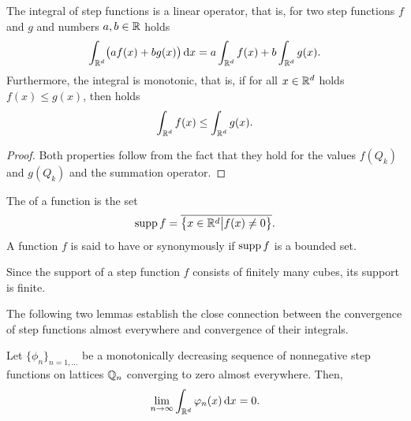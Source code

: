 \begin{lemma}
  The integral of step functions is a linear operator,
  that is, for two step functions $f$ and $g$ and numbers $a,b\in
  \mathbb R$ holds
  \begin{gather*}
    \int_{\mathbb R^d}\bigl(a f(x)+b g(x)\bigr) \,\mathrm{d} x
    = a\int_{\mathbb R^d} f(x) + b \int_{\mathbb R^d} g(x).
  \end{gather*}
  Furthermore, the integral is monotonic, that is, if for all $x\in
  \mathbb R^d$ holds $f(x) \le g(x)$, then holds
  \begin{gather*}
    \int_{\mathbb R^d} f(x) \le \int_{\mathbb R^d} g(x).
  \end{gather*}
\end{lemma}

\begin{proof}
  Both properties follow from the fact that they hold for the values
  $f(Q_k)$ and $g(Q_k)$ and the summation operator.
\end{proof}

\begin{definition}
  The  of a function is the set
  \begin{gather}
    \operatorname{supp} f = \overline{
      \bigl\{x\in \mathbb R^d\big| f(x) \neq 0 \bigr\}}.
  \end{gather}
  A function $f$ is said to have  or
  synonymously  if $\operatorname{supp} f$ is a bounded set.
\end{definition}

\begin{note}
  Since the support of a step function $f$ consists of finitely many
  cubes, its support is finite.
\end{note}

The following two lemmas establish the close connection between the
convergence of step functions almost everywhere and convergence of
their integrals.

\begin{lemma}
  \label{lemma:integral:1}
  Let $\{\phi_n\}_{n=1,\dots}$ be a monotonically decreasing sequence
  of nonnegative step functions on lattices $\mathbb Q_n$ converging to zero almost
  everywhere. Then,
  \begin{gather*}
    \lim_{n\to \infty}\int_{\mathbb R^d} \varphi_n(x) \,\mathrm{d} x = 0.
  \end{gather*}
\end{lemma}

